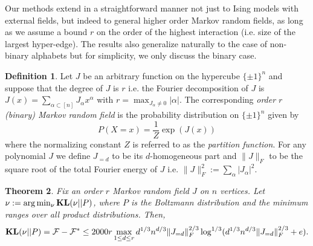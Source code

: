 \documentclass[final, 12pt]{colt2018}
\newcommand{\F}{\mathcal{F}}
\newcommand{\KL}{\mathop{\bf KL\/}}
\newcommand{\fnote}[1]{\textcolor{blue}{\small {\textbf{(Fred: }#1\textbf{) }}}}
\newtheorem{defn}[theorem]{Definition}
\newtheorem{theorem}{Theorem}[section]
\theoremstyle{definition}
\newtheorem{defn}[theorem]{Definition}
\theoremstyle{plain}
\begin{document}
Our methods extend in a straightforward manner not just to Ising models with external fields, but indeed to general higher order Markov random fields, as long
as we assume a bound $r$ on the order of the highest interaction (i.e. size of the largest hyper-edge). The
results also generalize naturally to the case of non-binary alphabets but for simplicity, we only discuss the binary case.
\begin{defn}%
Let $J$ be an arbitrary function on the hypercube $\{ \pm 1\}^n$
and suppose that the degree of $J$ is $r$ i.e. the Fourier decomposition of $J$ is 
$J(x) = \sum_{\alpha \subset [n]} J_{\alpha} x^{\alpha}$
with $r = \max_{J_{\alpha} \ne 0} |\alpha|$.
The corresponding \emph{order $r$ (binary) Markov random field} is the probability distribution
on $\{\pm 1\}^n$ given by
\[ P(X = x) = \frac{1}{Z}\exp(J(x)) \]
where the normalizing constant $Z$ is referred to as the \emph{partition function}.
For any polynomial $J$ we define $J_{=d}$ to be its $d$-homogeneous part and
 $\|J\|_F$ to be the square root of the total Fourier energy of $J$ i.e. $\|J\|_F^2 := \sum_{\alpha} |J_{\alpha}|^2$.
\end{defn}
\begin{theorem}\label{thm-mrf-main-structural-result} 
Fix an order $r$ Markov random field $J$ on $n$ vertices.
Let $\nu := \arg\min_{\nu} \KL(\nu || P)$, where $P$ is the Boltzmann distribution and the minimum ranges
over all product distributions.
Then, 
$$ \KL(\nu || P)  = \F - \F^{*} \leq 2000r \max_{1 \le d \le r} d^{1/3}n^{d/3} \|J_{=d}\|_F^{2/3} \log^{1/3}(d^{1/3}n^{d/3} \|J_{=d}\|_F^{2/3} + e).$$
\end{theorem}
\end{document}
